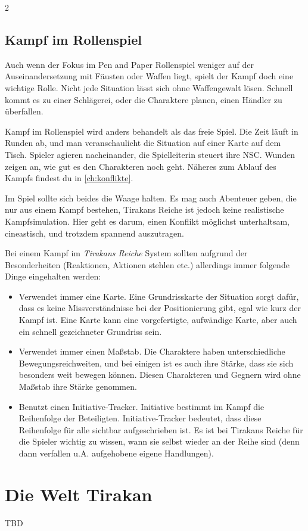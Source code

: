 \begin{multicols*}{2}
\subsection{Kampf im Rollenspiel}

Auch wenn der Fokus im Pen and Paper Rollenspiel weniger auf der Auseinandersetzung mit Fäusten oder Waffen liegt, spielt der Kampf doch eine wichtige Rolle. Nicht jede Situation lässt sich ohne Waffengewalt lösen. Schnell kommt es zu einer Schlägerei, oder die Charaktere planen, einen Händler zu überfallen.

Kampf im Rollenspiel wird anders behandelt als das freie Spiel. Die Zeit läuft in Runden ab, und man veranschaulicht die Situation auf einer Karte auf dem Tisch. Spieler agieren nacheinander, die Spielleiterin steuert ihre NSC. Wunden zeigen an, wie gut es den Charakteren noch geht. Näheres zum Ablauf des Kampfs findest du in \cref{ch:konflikte}.

Im Spiel sollte sich beides die Waage halten. Es mag auch Abenteuer geben, die nur aus einem Kampf bestehen, Tirakans Reiche ist jedoch keine realistische Kampfsimulation. Hier geht es darum, einen Konflikt möglichst unterhaltsam, cineastisch, und trotzdem spannend auszutragen.

Bei einem Kampf im \textit{Tirakans Reiche} System sollten aufgrund der Besonderheiten (Reaktionen, Aktionen stehlen etc.) allerdings immer folgende Dinge eingehalten werden:

\begin{itemize}
    \item Verwendet immer eine Karte. Eine Grundrisskarte der Situation sorgt dafür, dass es keine Missverständnisse bei der Positionierung gibt, egal wie kurz der Kampf ist. Eine Karte kann eine vorgefertigte, aufwändige Karte, aber auch ein schnell gezeichneter Grundriss sein.
    \item Verwendet immer einen Maßstab. Die Charaktere haben unterschiedliche Bewegungsreichweiten, und bei einigen ist es auch ihre Stärke, dass sie sich besonders weit bewegen können. Diesen Charakteren und Gegnern wird ohne Maßstab ihre Stärke genommen.
    \item Benutzt einen Initiative-Tracker. Initiative bestimmt im Kampf die Reihenfolge der Beteiligten. Initiative-Tracker bedeutet, dass diese Reihenfolge für alle sichtbar aufgeschrieben ist. Es ist bei Tirakans Reiche für die Spieler wichtig zu wissen, wann sie selbst wieder an der Reihe sind (denn dann verfallen u.A. aufgehobene eigene Handlungen).
\end{itemize}

\section{Die Welt Tirakan}
TBD

\end{multicols*}
